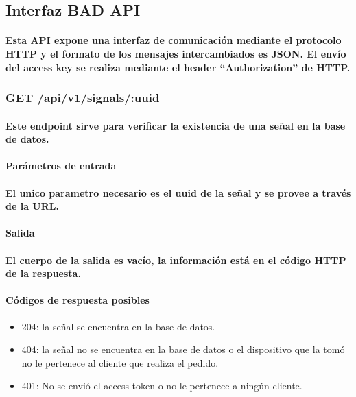 \documentclass{article}
\begin{document}
\subsection{Interfaz BAD API}
\paragraph{
Esta API expone una interfaz de comunicación mediante el protocolo HTTP y el formato de los mensajes intercambiados es JSON. El envío del access key se realiza mediante el header “Authorization” de HTTP.
}
\subsubsection{GET /api/v1/signals/:uuid}
\paragraph{
Este endpoint sirve para verificar la existencia de una señal en la base de datos.
}

\paragraph{
    \textbf{Parámetros de entrada}
}

\paragraph{
El unico parametro necesario es el uuid de la señal y se provee a través de la URL.
}

\paragraph{
    \textbf{Salida}
}

\paragraph{
El cuerpo de la salida es vacío, la información está en el código HTTP de la respuesta.
}
\paragraph{
Códigos de respuesta posibles
}
\begin{itemize}
    \item 204: la señal se encuentra en la base de datos.
    \item 404: la señal no se encuentra en la base de datos o el dispositivo que la tomó no le pertenece al cliente que realiza el pedido.
    \item 401: No se envió el access token o no le pertenece a ningún cliente.
\end{itemize}
\end{document}
